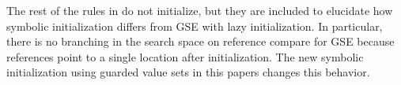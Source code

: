 The rest of the rules in  do not initialize, but they are included to elucidate how symbolic initialization differs from GSE with lazy initialization. In particular, there is no branching in the search space on reference compare for GSE because references point to a single location after initialization. The new symbolic initialization using guarded value sets in this papers changes this behavior. 



